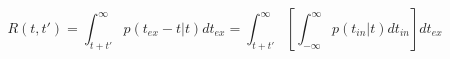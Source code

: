 \begin{equation}
R(t,t') = \int_{t+t'}^\infty p(t_{ex}-t|t) dt_{ex}  = \int_{t+t'}^\infty \left[ \int_{-\infty}^\infty p(t_{in}|t) dt_{in} \right]  dt_{ex}
\end{equation}